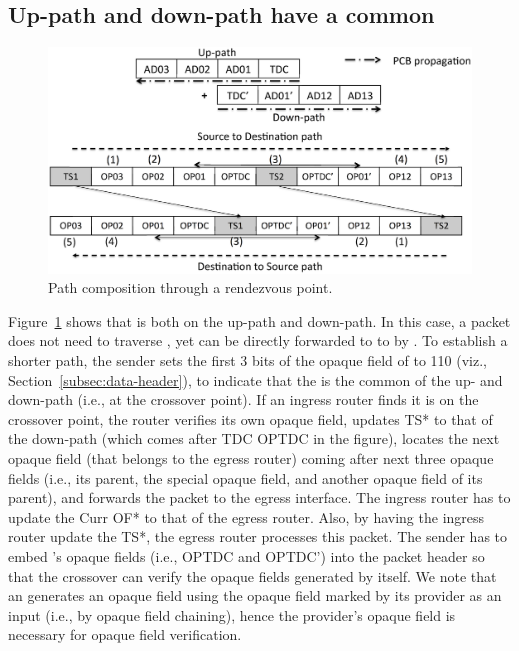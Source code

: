 \subsection{Up-path and down-path have a common \AD}

\begin{figure}[h]
\centering
\includegraphics[width=.9\columnwidth]{./fig/nex_fwd2.eps}
\caption{Path composition through a rendezvous point.}\label{fig:ex-fwd-crossover}
\end{figure}

\noindent Figure~\ref{fig:ex-fwd-crossover} shows that  is both on the up-path and down-path. In this case, a packet does not need to traverse \ISDC \AD, yet can be directly forwarded to to  by . To establish a shorter path, the sender sets the first 3 bits of the opaque field of  to 110 (viz., Section~\ref{subsec:data-header}), to indicate that the  is the common \AD of the up- and down-path (i.e., at the crossover point). If an ingress router finds it is on the crossover point, the router verifies its own opaque field, updates TS* to that of the down-path (which comes after TDC OPTDC in the figure), locates the next opaque field (that belongs to the egress router) coming after next three opaque fields (i.e., its parent, the special opaque field, and another opaque field of its parent), and forwards the packet to the egress interface. The ingress router has to update the Curr OF* to that of the egress router. Also, by having the ingress router update the TS*, the egress router processes this packet. The sender has to embed \ISDC's opaque fields (i.e., OPTDC and OPTDC') into the packet header so that the crossover \AD can verify the opaque fields generated by itself. We note that an \AD generates an opaque field using the opaque field marked by its provider as an input (i.e., by opaque field chaining), hence the provider's opaque field is necessary for opaque field verification.  



